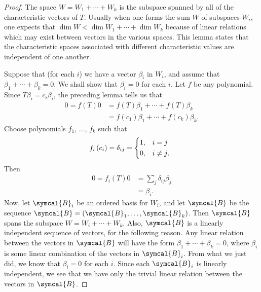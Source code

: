 \begin{proof}
    The space \(W=W_1+\cdots+W_k\) is the subspace spanned by all of the characteristic vectors of \(T\). Usually when one forms the sum \(W\) of subspaces \(W_i\), one expects that \(\dim W<\dim W_1+\cdots+\dim W_k\) because of linear relations which may exist between vectors in the various spaces. This lemma states that the characteristic spaces associated with different characteristic values are independent of one another.

    Suppose that (for each \(i\)) we have a vector \(\beta_i\) in \(W_i\), and assume that \(\beta_1+\cdots+\beta_k=0\). We shall show that \(\beta_i=0\) for each \(i\). Let \(f\) be any polynomial. Since \(T\beta_i=c_i\beta_i\), the preceding lemma tells us that
    \begin{align*}
        0=f\left(T\right)0&=f\left(T\right)\beta_1+\cdots+f\left(T\right)\beta_k\\
                          &=f\left(c_1\right)\beta_1+\cdots+f\left(c_k\right)\beta_k.
    \end{align*}
    Choose polynomials \(f_1\), \(\ldots\), \(f_k\) such that
    \begin{equation*}
        f_i\left(c_i\right)=\delta_{ij}=
        \begin{cases*}
            1, & \(i=j\) \\
            0, & \(i\ne j\).
        \end{cases*}
    \end{equation*}
    Then
    \begin{align*}
        0=f_i\left(T\right)0&=\sum_j\delta_{ij}\beta_j\\
                            &=\beta_i.
    \end{align*}
    Now, let \(\symcal{B}_i\) be an ordered basis for \(W_i\), and let \(\symcal{B}\) be the sequence \(\symcal{B}=\left(\symcal{B}_1,\ldots,\symcal{B}_k\right)\). Then \(\symcal{B}\) spans the subspace \(W=W_i+\cdots+W_k\). Also, \(\symcal{B}\) is a linearly independent sequence of vectors, for the following reason. Any linear relation between the vectors in \(\symcal{B}\) will have the form \(\beta_1+\cdots+\beta_k=0\), where \(\beta_i\) is some linear combination of the vectors in \(\symcal{B}_i\). From what we just did, we know that \(\beta_i=0\) for each \(i\). Since each \(\symcal{B}_i\) is linearly independent, we see that we have only the trivial linear relation between the vectors in \(\symcal{B}\).
\end{proof}

